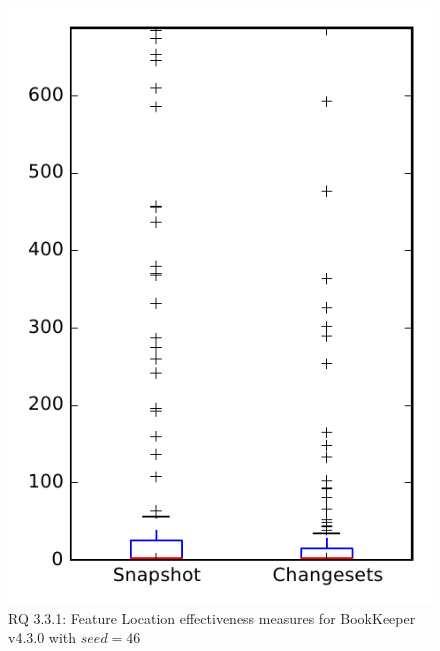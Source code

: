 
\begin{figure}
\centering
\includegraphics[height=0.4\textheight]{figures/flt_seed/rq1_bookkeeper_46}
\caption{RQ 3.3.1: Feature Location effectiveness measures for BookKeeper v4.3.0 with $seed=46$}
\label{fig:flt_seed:rq1:bookkeeper}
\end{figure}
